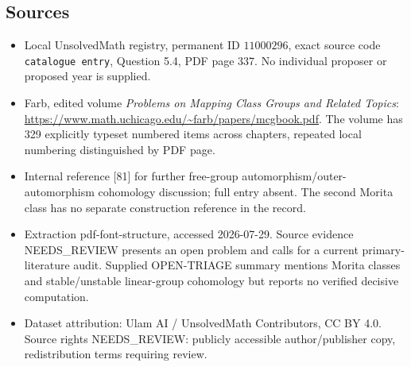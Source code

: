 \documentclass[11pt]{article}
\begin{document}
\subsection{Sources}
\begin{itemize}
\item Local UnsolvedMath registry, permanent ID \(11000296\), exact source code \texttt{catalogue entry}, Question 5.4, PDF page 337. No individual proposer or proposed year is supplied.
\item Farb, edited volume \emph{Problems on Mapping Class Groups and Related Topics}: \url{https://www.math.uchicago.edu/~farb/papers/mcgbook.pdf}. The volume has 329 explicitly typeset numbered items across chapters, repeated local numbering distinguished by PDF page.
\item Internal reference [81] for further free-group automorphism/outer-automorphism cohomology discussion; full entry absent. The second Morita class has no separate construction reference in the record.
\item Extraction pdf-font-structure, accessed 2026-07-29. Source evidence NEEDS\_REVIEW presents an open problem and calls for a current primary-literature audit. Supplied OPEN-TRIAGE summary mentions Morita classes and stable/unstable linear-group cohomology but reports no verified decisive computation.
\item Dataset attribution: Ulam AI / UnsolvedMath Contributors, CC BY 4.0. Source rights NEEDS\_REVIEW: publicly accessible author/publisher copy, redistribution terms requiring review.
\end{itemize}
\end{document}
